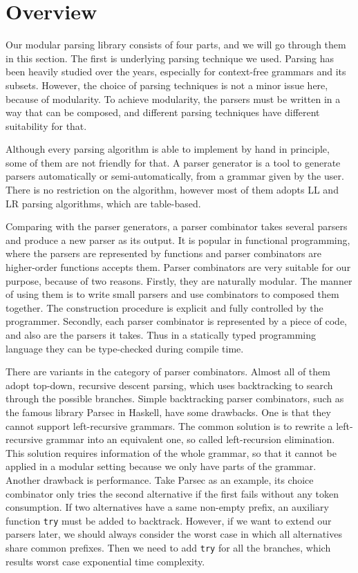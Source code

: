 \section{Overview}\label{sec:overview}

Our modular parsing library consists of four parts, and we will go through them in this section. The first is underlying parsing technique we used. Parsing has been heavily studied over the years, especially for context-free grammars and its subsets. However, the choice of parsing techniques is not a minor issue here, because of modularity. To achieve modularity, the parsers must be written in a way that can be composed, and different parsing techniques have different suitability for that.

Although every parsing algorithm is able to implement by hand in principle, some of them are not friendly for that. A parser generator is a tool to generate parsers automatically or semi-automatically, from a grammar given by the user. There is no restriction on the algorithm, however most of them adopts LL and LR parsing algorithms, which are table-based.


Comparing with the parser generators, a parser combinator takes several parsers and produce a new parser as its output. It is popular in functional programming, where the parsers are represented by functions and parser combinators are higher-order functions accepts them. Parser combinators are very suitable for our purpose, because of two reasons. Firstly, they are naturally modular. The manner of using them is to write small parsers and use combinators to composed them together. The construction procedure is explicit and fully controlled by the programmer. Secondly, each parser combinator is represented by a piece of code, and also are the parsers it takes. Thus in a statically typed programming language they can be type-checked during compile time.

There are variants in the category of parser combinators. Almost all of them adopt top-down, recursive descent parsing, which uses backtracking to search through the possible branches. Simple backtracking parser combinators, such as the famous library Parsec in Haskell, have some drawbacks. One is that they cannot support left-recursive grammars. The common solution is to rewrite a left-recursive grammar into an equivalent one, so called left-recursion elimination. This solution requires information of the whole grammar, so that it cannot be applied in a modular setting because we only have parts of the grammar. Another drawback is performance. Take Parsec as an example, its choice combinator only tries the second alternative if the first fails without any token consumption. If two alternatives have a same non-empty prefix, an auxiliary function \lstinline{try} must be added to backtrack. However, if we want to extend our parsers later, we should always consider the worst case in which all alternatives share common prefixes. Then we need to add \lstinline{try} for all the branches, which results worst case exponential time complexity.

